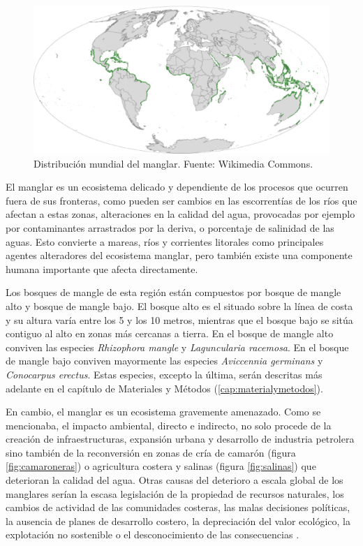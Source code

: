 \begin{figure}
	\centering
	\includegraphics[width=0.8\linewidth]{./Imagenes/distribucion_mundial_mangle.eps}
	\caption[Distribución mundial de manglar]{Distribución mundial del manglar. Fuente: Wikimedia Commons.}
	\label{fig:mundial}
\end{figure}

El manglar es un ecosistema delicado y dependiente de los procesos que ocurren fuera de sus fronteras, como pueden ser cambios en las escorrentías de los ríos que afectan a estas zonas, alteraciones en la calidad del agua, provocadas por ejemplo por contaminantes arrastrados por la deriva, o porcentaje de salinidad de las aguas. Esto convierte a mareas, ríos y corrientes litorales como principales agentes alteradores del ecosistema manglar, pero también existe una componente humana importante que afecta directamente.\Sep

Los bosques de mangle de esta región están compuestos por bosque de mangle alto y bosque de mangle bajo. El bosque alto es el situado sobre la línea de costa y su altura varía entre los 5 y los 10 metros, mientras que el bosque bajo se sitúa contiguo al alto en zonas más cercanas a tierra. En el bosque de mangle alto conviven las especies \textit{Rhizophora mangle} y \textit{Laguncularia racemosa}. En el bosque de mangle bajo conviven mayormente las especies \textit{Aviccennia germinans} y \textit{Conocarpus erectus}. Estas especies, excepto la última, serán descritas más adelante en el capítulo de Materiales y Métodos (\ref{cap:materialymetodos}).\Sep

En cambio, el manglar es un ecosistema gravemente amenazado. Como se mencionaba, el impacto ambiental, directo e indirecto, no solo procede de la creación de infraestructuras, expansión urbana y desarrollo de industria petrolera sino también de la reconversión en zonas de cría de camarón (figura \ref{fig:camaroneras}) o agricultura costera y salinas (figura \ref{fig:salinas}) que deterioran la calidad del agua. Otras causas del deterioro a escala global de los manglares serían la escasa legislación de la propiedad de recursos naturales, los cambios de actividad de las comunidades costeras, las malas decisiones políticas, la ausencia de planes de desarrollo costero, la depreciación del valor ecológico, la explotación no sostenible o el desconocimiento de las consecuencias \citep{yanez1994}.\Sep


